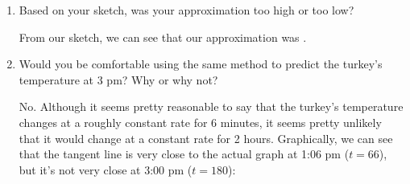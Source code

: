 \documentclass{article}
\begin{document}
\begin{enumerate}[resume]
\begin{enumerate}
\begin{solution}
\begin{center}
\begin{tikzpicture}
        \end{tikzpicture}
      \end{center}
      Although what we wanted was the $y$-value on the black curve at $t = 66$, we approximated this by the $y$-value on the blue line at $t = 66$.
    \end{solution}

  \item \label{linear-approximation-turkey-approx-over-under}
    \begin{problem}[\vfill]
      Based on your sketch, was your approximation too high or too low? 
    \end{problem}

    \begin{solution}
      From our sketch, we can see that our approximation was .
    \end{solution}

  \item
    \begin{problem}[\vfill\newpage]
      Would you be comfortable using the same method to predict the turkey's temperature at 3 pm? Why or why not?
    \end{problem}

    \begin{solution}
      No. Although it seems pretty reasonable to say that the turkey's temperature changes at a roughly constant rate for 6 minutes, it seems pretty unlikely that it would change at a constant rate for 2 hours. Graphically, we can see that the tangent line is very close to the actual graph at 1:06 pm ($t = 66$), but it's not very close at 3:00 pm ($t = 180$):
      \begin{center}
      \end{center}
    \end{solution}

  \end{enumerate}


\end{enumerate}
\end{document}
